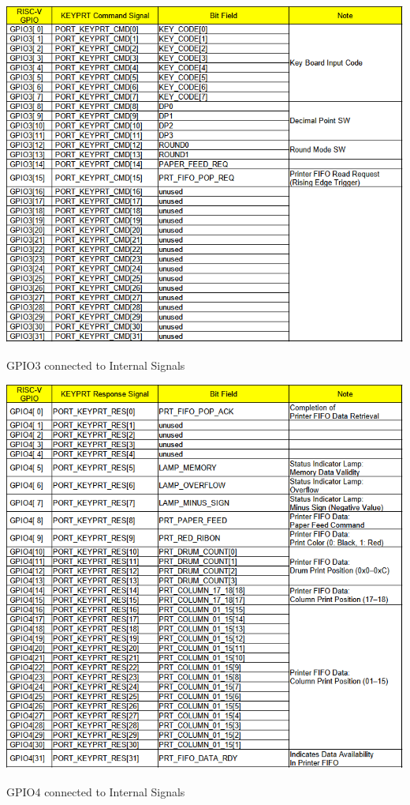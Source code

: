 \begin{table}
    \includegraphics[width=0.75\columnwidth]{./Table/INTGPIO3.png}
    \caption{GPIO3 connected to Internal Signals}
    \label{tb:INTGPIO3}
\end{table}
\begin{table}
    \includegraphics[width=0.75\columnwidth]{./Table/INTGPIO4.png}
    \caption{GPIO4 connected to Internal Signals}
    \label{tb:INTGPIO4}
\end{table}
